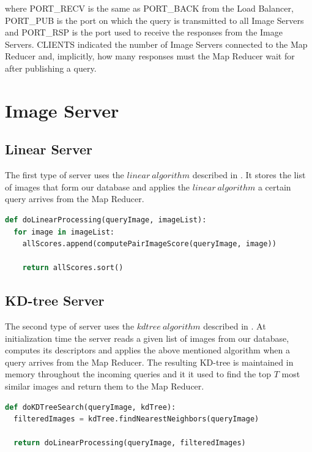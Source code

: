 where PORT_RECV is the same as PORT_BACK from the Load Balancer, PORT_PUB is the port on which the query is transmitted to all Image Servers and PORT_RSP is the port used to receive the responses from the Image Servers.
CLIENTS indicated the number of Image Servers connected to the Map Reducer and, implicitly, how many responses must the Map Reducer wait for after publishing a query.

\section{Image Server}

\subsection{Linear Server}
	The first type of server uses the $linear\ algorithm$ described in . It stores the list of images that form our database and applies the $linear\ algorithm$ a certain query arrives from the Map Reducer.\\

\begin{lstlisting}[language=python, caption=Linear Image Server pseudocode]
def doLinearProcessing(queryImage, imageList):
  for image in imageList:
    allScores.append(computePairImageScore(queryImage, image))
	
    return allScores.sort()
\end{lstlisting}

\subsection{KD-tree Server}
	The second type of server uses the $kdtree\ algorithm$ described in . At initialization time the server reads a given list of images from our database, computes its descriptors and applies the above mentioned algorithm when a query arrives from the Map Reducer. The resulting KD-tree is maintained in memory throughout the incoming queries and it it used to find the top $T$ most similar images and return them to the Map Reducer.\\

\begin{lstlisting}[language=python, caption=KD-Tree Image Server pseudocode]
def doKDTreeSearch(queryImage, kdTree):
  filteredImages = kdTree.findNearestNeighbors(queryImage)
	
  return doLinearProcessing(queryImage, filteredImages)
\end{lstlisting}

